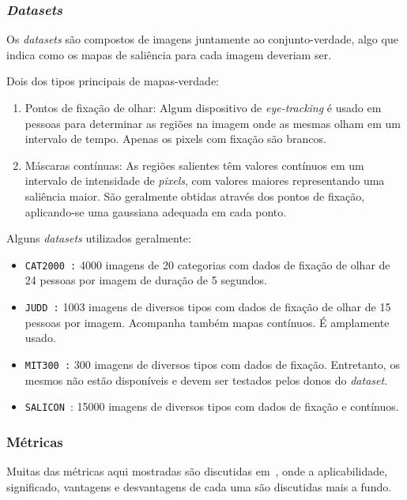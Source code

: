 \documentclass[11pt]{article}
\newcommand{\tit}[1]{\textit{#1}}
\newcommand{\ttt}[1]{\texttt{#1}}
\begin{document}
\subsubsection{\tit{Datasets}}
Os \tit{datasets} são compostos de imagens juntamente ao conjunto-verdade,
algo que indica como os mapas de saliência para cada imagem deveriam ser.

Dois dos tipos principais de mapas-verdade:
\begin{enumerate}
	\item Pontos de fixação de olhar: Algum dispositivo de
	\tit{eye-tracking} é usado em pessoas para determinar as regiões na imagem
	onde as mesmas olham em um intervalo de tempo. Apenas os pixels com
	fixação são brancos.

	\item Máscaras contínuas: As regiões salientes têm valores
	contínuos em um intervalo de intensidade de \tit{pixels}, com valores
	maiores representando uma saliência maior.
	São geralmente obtidas através dos pontos de fixação, aplicando-se
	uma gaussiana adequada em cada ponto.
\end{enumerate}

Alguns \tit{datasets} utilizados geralmente:
\begin{itemize}
	\item \ttt{CAT2000~\cite{cat2000}:} 4000 imagens de 20 categorias com
		dados de fixação de olhar de 24 pessoas por imagem de duração de
		5 segundos.

	\item \ttt{JUDD~\cite{juddBM}:} 1003 imagens de diversos tipos com
		dados de fixação de olhar de 15 pessoas por imagem. Acompanha também
		mapas contínuos. É amplamente usado.

	\item \ttt{MIT300~\cite{mit-300}:} 300 imagens de diversos tipos
		com dados de fixação. Entretanto, os mesmos não estão disponíveis
		e devem ser testados pelos donos do \tit{dataset}.

    \item \ttt{SALICON}~\cite{jiang_2015}: 15000 imagens de diversos tipos
        com dados de fixação e contínuos.
\end{itemize}

\subsubsection{Métricas}
Muitas das métricas aqui mostradas são discutidas em~\cite{judd2},
onde a aplicabilidade, significado, vantagens e desvantagens
de cada uma são discutidas mais a fundo.
\end{document}
